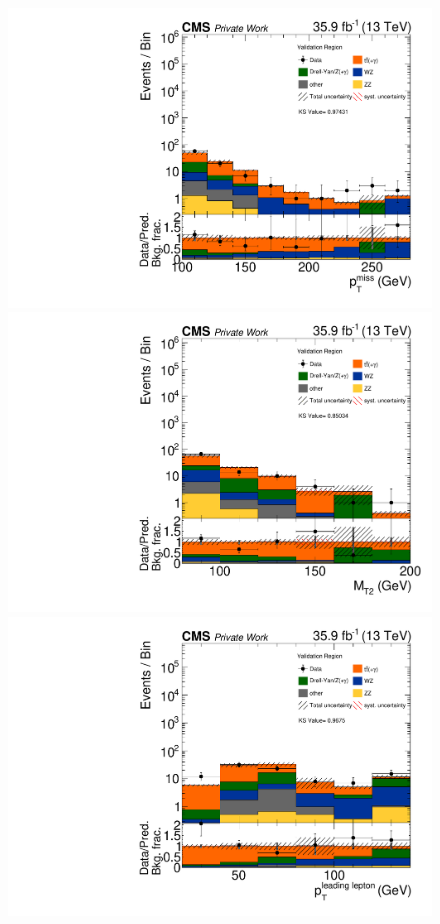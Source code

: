 \begin{figure}[tbp]
 \centering
 \includegraphics[width=\pairwidth]{figures/plots_VR/VR_LL_met_log}
 \includegraphics[width=\pairwidth]{figures/plots_VR/VR_LL_mt2_log}\\
 \includegraphics[width=\pairwidth]{figures/plots_VR/VR_LL_pt1_log}

\end{figure}
